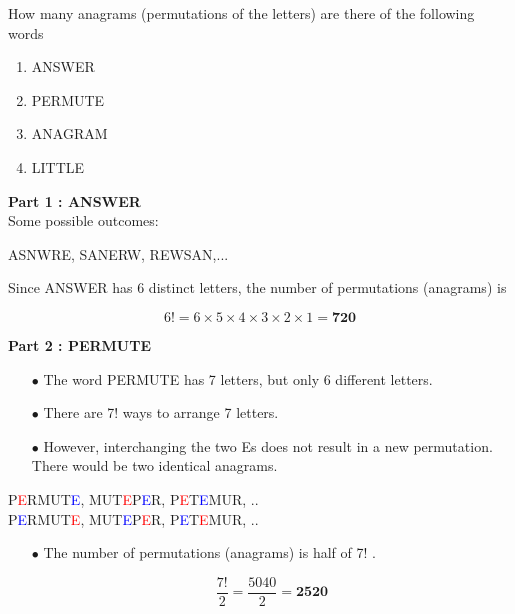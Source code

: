 \documentclass[]{report}
\begin{document}
How many anagrams (permutations of the letters) are there of the following words

\begin{framed}
\begin{multicols}{2}
\begin{enumerate}
	\item ANSWER
	\item PERMUTE
	\item ANAGRAM
	\item LITTLE
\end{enumerate}
\end{multicols}
\end{framed}


\textbf{Part 1 : ANSWER}\\
Some possible outcomes:
\begin{center}
	ASNWRE,\;
	SANERW,\;
	REWSAN,\;...
\end{center}

Since ANSWER has 6 distinct letters, the number of permutations (anagrams) is

\[6! = 6\times 5 \times 4 \times 3 \times 2\times 1 = \boldsymbol{720} \]

\textbf{Part 2 : PERMUTE}\\
\begin{itemize}
	\item[$\bullet$] The word PERMUTE has 7 letters, but only 6 different letters. 
	\item[$\bullet$] There are 7! ways to arrange 7 letters.
	\item[$\bullet$] However, interchanging the two Es does not result in a new permutation. There would be two identical anagrams.
\end{itemize}

\begin{center}
	P\textcolor{red}{E}RMUT\textcolor{blue}{E}, \; MUT\textcolor{red}{E}P\textcolor{blue}{E}R, \; P\textcolor{red}{E}T\textcolor{blue}{E}MUR,\; ..\\
	P\textcolor{blue}{E}RMUT\textcolor{red}{E}, \; MUT\textcolor{blue}{E}P\textcolor{red}{E}R, \; P\textcolor{blue}{E}T\textcolor{red}{E}MUR,\; ..
\end{center}


\begin{itemize}
	\item[$\bullet$]  The number of permutations (anagrams) is half of 7! .
	
	\[\frac{7!}{2} =  \frac{5040}{2} = \boldsymbol{2520} \]
\end{itemize}
\end{document}
